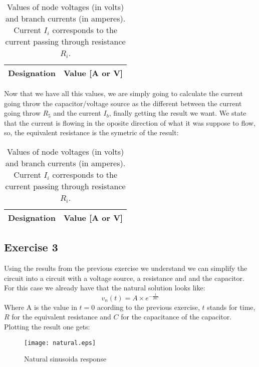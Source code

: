 \begin{table}[H]
  \centering
  \begin{tabular}{|c|c|}
    \hline
        {\bf Designation} & {\bf Value [A or V]} \\ \hline
        
  \end{tabular}
  \caption{Values of node voltages (in volts) and branch currents (in amperes). Current $I_i$ corresponds to the current passing through resistance $R_i$.}
  \label{tab:Exercise2Theoretical}
\end{table}
Now that we have all this values, we are simply going to calculate the current going throw the capacitor/voltage source as the different between the current going throw $R_5$ and the current $I_b$, finally getting the result we want. We state that the current is flowing in the oposite direction of what it was suppose to flow, so, the equivalent resistance is the symetric of the result:
\begin{table}[H]
  \centering
  \begin{tabular}{|c|c|}
    \hline
        {\bf Designation} & {\bf Value [A or V]} \\ \hline
        
  \end{tabular}
  \caption{Values of node voltages (in volts) and branch currents (in amperes). Current $I_i$ corresponds to the current passing through resistance $R_i$.}
  \label{tab:Exercise2.1Theoretical}
\end{table}

\subsection{Exercise 3}
Using the results from the previous exercise we understand we can simplify the circuit into a circuit with a voltage source, a resistance and and the capacitor. For this case we already have that the natural solution looks like:
\begin{equation}
  v_n(t)=A \times e^{-\frac{t}{RC}}
  \end{equation}
Where A is the value in $t=0$ acording to the previous exercise, $t$ stands for time, $R$ for the equivalent resistance and $C$ for the capacitance of the capacitor. Plotting the result one gets:
\begin{figure}[h] \centering
\texttt{[image: natural.eps]}
\caption{Natural sinusoida response}
\label{fig:natural}
\end{figure}
